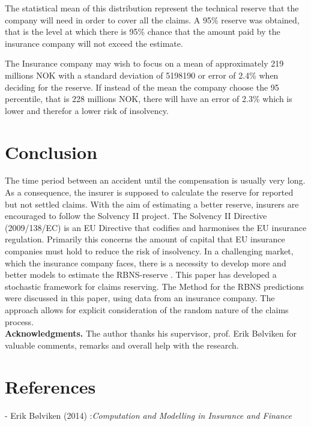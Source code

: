 \documentclass[a4paper]{article}
\begin{document}
The statistical mean of this distribution represent the technical reserve that the company will need in order to cover all the claims. A 95\% reserve was obtained, that is the level at which there is 95\% chance that the amount paid by the insurance company will not exceed the estimate. 

The Insurance company may wish to focus on a mean of approximately 219 millions NOK with a standard deviation of  5198190 or error of 2.4\% when deciding for the reserve. If instead of the mean the company choose the 95 percentile, that is 228 millions NOK, there will have an error of 2.3\% which is lower and therefor a lower risk of insolvency. \\




\section{Conclusion} 


The time period between an accident until the compensation is usually very long. As a consequence, the insurer is supposed to calculate the reserve for reported but not settled claims. With the aim of estimating a better reserve, insurers are encouraged  to follow the Solvency II project. The Solvency II Directive (2009/138/EC) is an EU Directive that codifies and harmonises the EU insurance regulation. Primarily this concerns the amount of capital that EU insurance companies must hold to reduce the risk of insolvency.
In a challenging market, which the insurance company faces, there is a necessity to develop more and better models to estimate the RBNS-reserve .
This paper has developed a stochastic framework for claims reserving.
The Method for the RBNS predictions were discussed in this paper, using data from an insurance company. The approach allows for explicit consideration of the random nature of the claims process.  \\



  \textbf{ Acknowledgments.}
The author thanks his supervisor, prof.  Erik Bølviken for valuable comments, remarks and overall help with the research. \\


\section{ References}


- Erik Bølviken (2014) :\textit{Computation and Modelling in Insurance and Finance }
\end{document}
